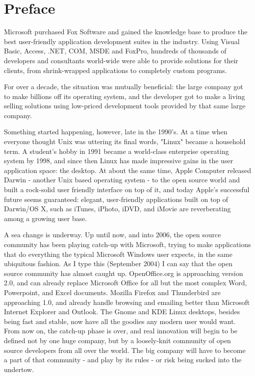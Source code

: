 
\chapter{Preface}

Microsoft purchased Fox Software and gained the knowledge base to produce the 
best user-friendly application development suites in the industry. Using Visual Basic, 
Access, .NET, COM, MSDE and FoxPro, hundreds of thousands of developers and 
consultants world-wide were able to provide solutions for their clients, from 
shrink-wrapped applications to completely custom programs.

For over a decade, the situation was mutually beneficial: the large company got to 
make billions off its operating system, and the developer got to make a living selling 
solutions using low-priced development tools provided by that same large company.

Something started happening, however, late in the 1990's. At a time when everyone 
thought Unix was uttering its final words, "Linux" became a household term. A 
student's hobby in 1991 became a world-class enterprise operating system by 1998, 
and since then Linux has made impressive gains in the user application space: the 
desktop. At about the same time, Apple Computer released Darwin - another Unix 
based operating system - to the open source world and built a rock-solid user 
friendly interface on top of it, and today Apple's successful future seems guaranteed: 
elegant, user-friendly applications built on top of Darwin/OS X, such as iTunes, 
iPhoto, iDVD, and iMovie are reverberating among a growing user base.

A sea change is underway. Up until now, and into 2006, the open source community 
has been playing catch-up with Microsoft, trying to make applications that do 
everything the typical Microsoft Windows user expects, in the same ubiquitous 
fashion. As I type this (September 2004) I can say that the open source community 
has almost caught up. OpenOffice.org is approaching version 2.0, and can already 
replace Microsoft Office for all but the most complex Word, Powerpoint, and Excel 
documents. Mozilla Firefox and Thunderbird are approaching 1.0, and already 
handle browsing and emailing better than Microsoft Internet Explorer and Outlook. 
The Gnome and KDE Linux desktops, besides being fast and stable, now have all 
the goodies any modern user would want. From now on, the catch-up phase is over, 
and real innovation will begin to be defined not by one huge company, but by a 
loosely-knit community of open source developers from all over the world. The big 
company will have to become a part of that community - and play by its rules - or 
risk being sucked into the undertow.

